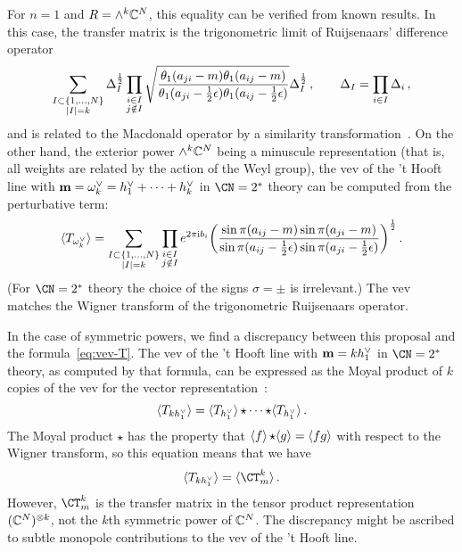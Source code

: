 For $n = 1$ and $R = \wedge^k \mathbb{C}^N$, this equality can be verified
from known results.  In this case, the transfer matrix is the
trigonometric limit of Ruijsenaars' difference
operator~\cite{Ruijsenaars:1986pp}
\begin{equation}
  \sum_{\substack{I \subset \{1, \dotsc, N\} \\ |I| = k}}
  \Delta_I^{\frac12}
  \prod_{\substack{i \in I \\ j \notin I}}
  \sqrt{
    \frac{\theta_1(a_{ji} - m) \theta_1(a_{ij} - m)}
         {\theta_1(a_{ji} - \frac12 \epsilon) \theta_1(a_{ij} - \frac12 \epsilon)}
  }
  \Delta_I^{\frac12} \,,
  \qquad
  \Delta_I = \prod_{i \in I} \Delta_i \,,
\end{equation}
and is related to the Macdonald operator by a similarity
transformation~\cite{MR1463830}.  On the other hand, the exterior
power $\wedge^k \mathbb{C}^N$ being a minuscule representation (that is, all
weights are related by the action of the Weyl group), the vev of the
't Hooft line with
$\mathbf{m} = \omega^\vee_k = h^\vee_1 + \dotsb + h^\vee_k$ in
$\CN = 2^*$ theory can be computed from the perturbative term:
\begin{equation}
  \langle T_{\omega^\vee_k} \rangle
  =
  \sum_{\substack{I \subset \{1, \dotsc, N\} \\ |I| = k}}
  \prod_{\substack{i \in I \\ j \notin I}}
  e^{2\pi\mathrm{i} b_i}
  \biggl(
  \frac{\sin\pi(a_{ij} - m) \sin\pi(a_{ji} - m)}
       {\sin\pi(a_{ij} - \frac12\epsilon) \sin\pi(a_{ji} - \frac12\epsilon)}
  \biggr)^{\frac12} \,.
\end{equation}
(For $\CN = 2^*$ theory the choice of the signs $\sigma = \pm$ is
irrelevant.)  The vev matches the Wigner transform of the
trigonometric Ruijsenaars operator.

In the case of symmetric powers, we find a discrepancy between this
proposal and the formula~\eqref{eq:vev-T}.  The vev of the 't Hooft
line with $\mathbf{m} = kh^\vee_1$ in $\CN = 2^*$ theory, as computed by
that formula, can be expressed as the Moyal product of $k$ copies of
the vev for the vector representation~\cite{Ito:2011ea,
  Hayashi:2019rpw}:
\begin{equation}
  \vev{T_{kh^\vee_1}}
  = \vev{T_{h^\vee_1}} \star \dotsb \star \vev{T_{h^\vee_1}} \,.
\end{equation}
The Moyal product $\star$ has the property that
$\vev{f} \star \vev{g} = \vev{fg}$ with respect to the Wigner
transform, so this equation means that we have
\begin{equation}
  \vev{T_{kh^\vee_1}} = \vev{\CT_m^k} \,.
\end{equation}
However, $\CT_m^k$ is the transfer matrix in the tensor product
representation $(\mathbb{C}^N)^{\otimes k}$, not the $k$th symmetric power of
$\mathbb{C}^N$.  The discrepancy might be ascribed to subtle monopole
contributions to the vev of the 't Hooft line.





